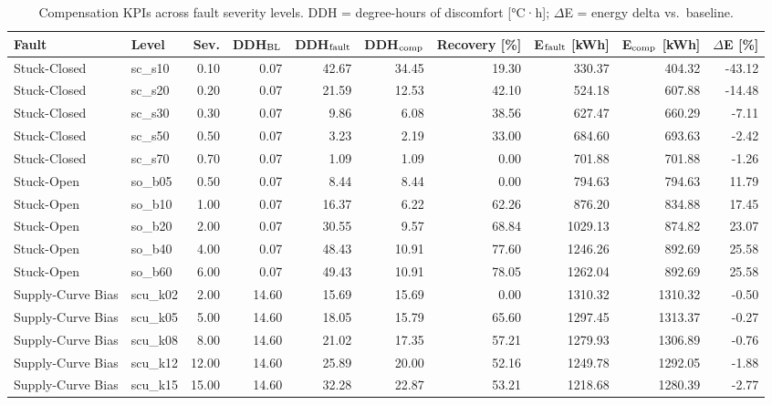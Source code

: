 \begin{table}[ht]
  \centering
  \caption{Compensation KPIs across fault severity levels. DDH = degree-hours of discomfort [°C·h]; $\Delta$E = energy delta vs.\ baseline.}
  \label{tab:severity_compensation}
  \small
  \begin{tabular}{llrrrrrrrr}
    \toprule
    Fault & Level & Sev. & DDH$_{\rm BL}$ & DDH$_{\rm fault}$ & DDH$_{\rm comp}$ & Recovery [\%] & E$_{\rm fault}$ [kWh] & E$_{\rm comp}$ [kWh] & $\Delta$E [\%] \\
    \midrule
    Stuck-Closed & sc_s10 & 0.10 & 0.07 & 42.67 & 34.45 & 19.30 & 330.37 & 404.32 & -43.12 \\
    Stuck-Closed & sc_s20 & 0.20 & 0.07 & 21.59 & 12.53 & 42.10 & 524.18 & 607.88 & -14.48 \\
    Stuck-Closed & sc_s30 & 0.30 & 0.07 & 9.86 & 6.08 & 38.56 & 627.47 & 660.29 & -7.11 \\
    Stuck-Closed & sc_s50 & 0.50 & 0.07 & 3.23 & 2.19 & 33.00 & 684.60 & 693.63 & -2.42 \\
    Stuck-Closed & sc_s70 & 0.70 & 0.07 & 1.09 & 1.09 & 0.00 & 701.88 & 701.88 & -1.26 \\
    Stuck-Open & so_b05 & 0.50 & 0.07 & 8.44 & 8.44 & 0.00 & 794.63 & 794.63 & 11.79 \\
    Stuck-Open & so_b10 & 1.00 & 0.07 & 16.37 & 6.22 & 62.26 & 876.20 & 834.88 & 17.45 \\
    Stuck-Open & so_b20 & 2.00 & 0.07 & 30.55 & 9.57 & 68.84 & 1029.13 & 874.82 & 23.07 \\
    Stuck-Open & so_b40 & 4.00 & 0.07 & 48.43 & 10.91 & 77.60 & 1246.26 & 892.69 & 25.58 \\
    Stuck-Open & so_b60 & 6.00 & 0.07 & 49.43 & 10.91 & 78.05 & 1262.04 & 892.69 & 25.58 \\
    Supply-Curve Bias & scu_k02 & 2.00 & 14.60 & 15.69 & 15.69 & 0.00 & 1310.32 & 1310.32 & -0.50 \\
    Supply-Curve Bias & scu_k05 & 5.00 & 14.60 & 18.05 & 15.79 & 65.60 & 1297.45 & 1313.37 & -0.27 \\
    Supply-Curve Bias & scu_k08 & 8.00 & 14.60 & 21.02 & 17.35 & 57.21 & 1279.93 & 1306.89 & -0.76 \\
    Supply-Curve Bias & scu_k12 & 12.00 & 14.60 & 25.89 & 20.00 & 52.16 & 1249.78 & 1292.05 & -1.88 \\
    Supply-Curve Bias & scu_k15 & 15.00 & 14.60 & 32.28 & 22.87 & 53.21 & 1218.68 & 1280.39 & -2.77 \\
    \bottomrule
  \end{tabular}
\end{table}
